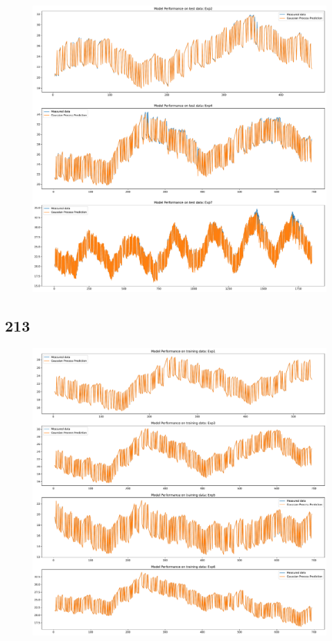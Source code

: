 \begin{figure}[ht]
    \centering
    \includegraphics[width = \textwidth]{Plots/GP_113_test_performance.pdf}
    \caption{}
    \label{fig:GP_test_validation}
\end{figure}

\clearpage

\subsection{213}

\begin{figure}[ht]
    \centering
    \includegraphics[width = \textwidth]{Plots/GP_213_training_performance.pdf}
    \caption{}
    \label{fig:GP_213_train_validation}
\end{figure}

